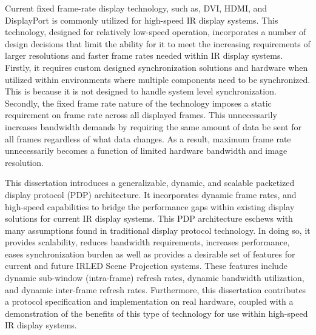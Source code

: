 Current fixed frame-rate display technology, such as, DVI, HDMI, and DisplayPort is commonly utilized for high-speed IR display systems. This technology, designed for relatively low-speed operation, incorporates a number of design decisions that limit the ability for it to meet the increasing requirements of larger resolutions and faster frame rates needed within IR display systems. Firstly, it requires custom designed synchronization solutions and hardware when utilized within environments where multiple components need to be synchronized. This is because it is not designed to handle system level synchronization. Secondly, the fixed frame rate nature of the technology imposes a static requirement on frame rate across all displayed frames. This unnecessarily increases bandwidth demands by requiring the same amount of data be sent for all frames regardless of what data changes. As a result, maximum frame rate unnecessarily becomes a function of limited hardware bandwidth and image resolution.

This dissertation introduces a generalizable, dynamic, and scalable packetized display protocol (PDP) architecture. It incorporates dynamic frame rates, and high-speed capabilities to bridge the performance gaps within existing display solutions for current IR display systems. This PDP architecture eschews with many assumptions found in traditional display protocol technology. In doing so, it provides scalability, reduces bandwidth requirements, increases performance, eases synchronization burden as well as provides a desirable set of features for current and future IRLED Scene Projection systems. These features include dynamic sub-window (intra-frame) refresh rates, dynamic bandwidth utilization, and dynamic inter-frame refresh rates. Furthermore, this dissertation contributes a protocol specification and implementation on real hardware, coupled with a demonstration of the benefits of this type of technology for use within high-speed IR display systems.
